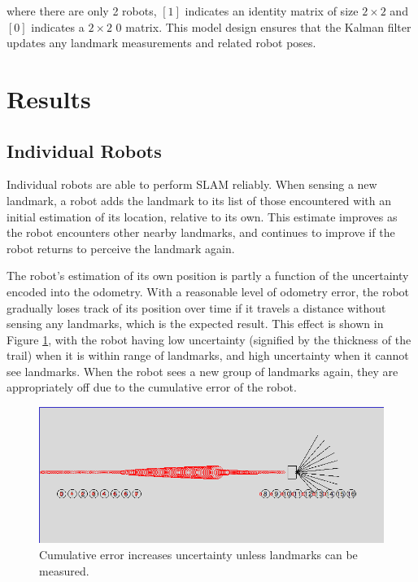 \documentclass[prodmode,acmtecs]{acmsmall} %
\begin{document}
where there are only 2 robots, $[1]$ indicates an identity matrix of size $2\times 2$ and $[0]$ indicates a $2\times 2$ 0 matrix. This model design ensures that the Kalman filter updates any landmark measurements and related robot poses.

\section{Results}

\subsection{Individual Robots}

Individual robots are able to perform SLAM reliably.  When sensing a new landmark, a robot adds the landmark to its list of those encountered with an initial estimation of its location, relative to its own.  This estimate improves as the robot encounters other nearby landmarks, and continues to improve if the robot returns to perceive the landmark again.

The robot's estimation of its own position is partly a function of the uncertainty encoded into the odometry.  With a reasonable level of odometry error, the robot gradually loses track of its position over time if it travels a distance without sensing any landmarks, which is the expected result. This effect is shown in Figure \ref{fig:waypoints}, with the robot having low uncertainty (signified by the thickness of the trail) when it is within range of landmarks, and high uncertainty when it cannot see landmarks. When the robot sees a new group of landmarks again, they are appropriately off due to the cumulative error of the robot.

\begin{figure}[h!]
\includegraphics[width=\textwidth]{waypoints.png}
\caption{Cumulative error increases uncertainty unless landmarks can be measured.}
\label{fig:waypoints}
\end{figure}
\end{document}

